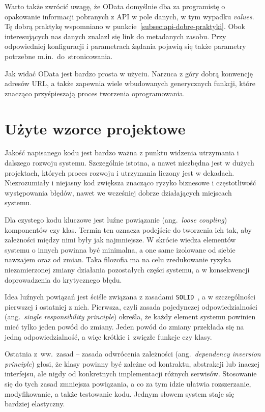 Warto także zwrócić uwagę, że OData domyślnie dba za programistę o opakowanie informacji pobranych z API w pole danych, w tym wypadku \emph{values}. Tę dobrą praktykę wspomniano w punkcie~\ref{subsec:api-dobre-praktyki}. Obok interesujących nas danych znalazł się link do metadanych zasobu. Przy odpowiedniej konfiguracji i parametrach żądania pojawią się także parametry potrzebne m.in.~do~stronicowania.

Jak widać OData jest bardzo prosta w użyciu. Narzuca z góry dobrą konwencję adresów URL, a także zapewnia wiele wbudowanych generycznych funkcji, które znacząco przyśpieszają proces tworzenia oprogramowania.

\section{Użyte wzorce projektowe}
\label{sec:wzorce}

Jakość napisanego kodu jest bardzo ważna z punktu widzenia utrzymania i dalszego rozwoju systemu. Szczególnie istotna, a nawet niezbędna jest w dużych projektach, których proces rozwoju i utrzymania liczony jest w dekadach. Niezrozumiały i niejasny kod zwiększa znacząco ryzyko biznesowe i częstotliwość występowania błędów, nawet we wcześniej dobrze działających miejscach systemu.

Dla czystego kodu kluczowe jest luźne powiązanie (ang.~\emph{loose coupling}) komponentów czy klas. Termin ten oznacza podejście do tworzenia ich tak, aby zależności między nimi były jak najmniejsze. W skrócie wiedza elementów systemu o innych powinna być minimalna, a one same izolowane od siebie nawzajem oraz od zmian. Taka filozofia ma na celu zredukowanie ryzyka niezamierzonej zmiany działania pozostałych części systemu, a w konsekwencji doprowadzenia do krytycznego błędu. 

Idea luźnych powiązań jest ściśle związana z zasadami \texttt{SOLID}~\cite{clean-code}, a w szczególności pierwszej i ostatniej z nich. Pierwsza\label{ref:SRP}, czyli zasada pojedynczej odpowiedzialności (ang.~\emph{single responsibility principle}) określa, że każdy element systemu powinien mieć tylko jeden powód do zmiany. Jeden powód do zmiany przekłada się na jedną odpowiedzialność, a więc krótkie i~zwięzłe funkcje czy klasy.

Ostatnia z~ww.~zasad -- zasada odwrócenia zależności (ang.~\emph{dependency inversion principle}) głosi, że klasy powinny być zależne od kontraktu, abstrakcji lub inaczej interfejsu, ale nigdy od konkretnych implementacji różnych serwisów. Stosowanie się do tych zasad zmniejsza powiązania, a co za tym idzie ułatwia rozszerzanie, modyfikowanie, a także testowanie kodu. Jednym słowem system staje się bardziej elastyczny.

